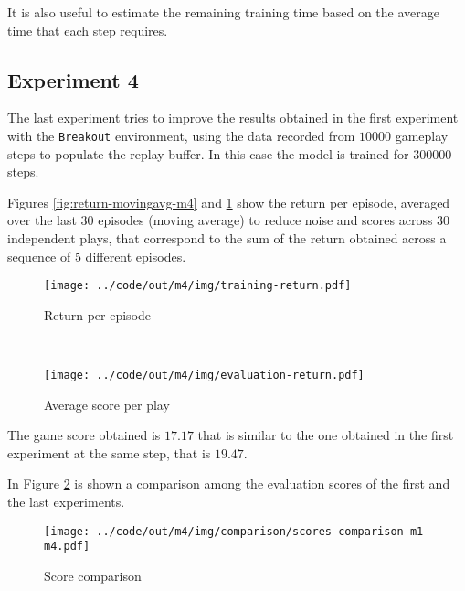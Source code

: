 \documentclass[a4paper,12pt]{article} %
\begin{document}
	
	It is also useful to estimate the remaining training time based on the average time that each step requires.
	
	\subsection*{Experiment 4}
	The last experiment tries to improve the results obtained in the first experiment with the \texttt{Breakout} environment, using the data recorded from $10000$ gameplay steps to populate the replay buffer.
	In this case the model is trained for $300000$ steps.
	\bigskip

	Figures \ref{fig:return-movingavg-m4} and \ref{fig:score-m4} show the return per episode, averaged over the last 30 episodes (moving average) to reduce noise and scores across 30 independent plays, that correspond to the sum of the return obtained across a sequence of 5 different episodes.
	
	\begin{figure}[h]
		\begin{minipage}[b]{.49\textwidth}
			\centering
			\texttt{[image: ../code/out/m4/img/training-return.pdf]}	
			\caption{Return per episode}
			\label{fig:return-movingavg-m4}
		\end{minipage}
		~
		\begin{minipage}[b]{.49\textwidth}
			\centering
			\texttt{[image: ../code/out/m4/img/evaluation-return.pdf]}	
			\caption{Average score per play}
			\label{fig:score-m4}
		\end{minipage}
	\end{figure}
	
	The game score obtained is $17.17$ that is similar to the one obtained in the first experiment at the same step, that is $19.47$.
	
	\bigskip
	
	In Figure \ref{fig:score-m1-m4} is shown a comparison among the evaluation scores of the first and the last experiments.
	
	\begin{figure}[htb]
		\centering
		\texttt{[image: ../code/out/m4/img/comparison/scores-comparison-m1-m4.pdf]}	
		\caption{Score comparison}
		\label{fig:score-m1-m4}
	\end{figure}
	
	
\end{document}
